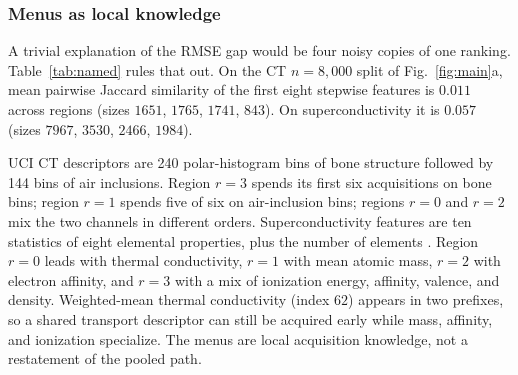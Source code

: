 \documentclass[pdflatex,sn-basic,Numbered]{sn-jnl}
\begin{document}
\subsubsection{Menus as local knowledge}
\label{sec:menu-knowledge}
A trivial explanation of the RMSE gap would be four noisy copies of one ranking. Table~\ref{tab:named} rules that out. On the CT \(n=8{,}000\) split of Fig.~\ref{fig:main}a, mean pairwise Jaccard similarity of the first eight stepwise features is \(0.011\) across regions (sizes \(1651\), \(1765\), \(1741\), \(843\)). On superconductivity it is \(0.057\) (sizes \(7967\), \(3530\), \(2466\), \(1984\)).

UCI CT descriptors are 240 polar-histogram bins of bone structure followed by 144 bins of air inclusions. Region \(r=3\) spends its first six acquisitions on bone bins; region \(r=1\) spends five of six on air-inclusion bins; regions \(r=0\) and \(r=2\) mix the two channels in different orders. Superconductivity features are ten statistics of eight elemental properties, plus the number of elements \cite{hamidieh2018}. Region \(r=0\) leads with thermal conductivity, \(r=1\) with mean atomic mass, \(r=2\) with electron affinity, and \(r=3\) with a mix of ionization energy, affinity, valence, and density. Weighted-mean thermal conductivity (index \(62\)) appears in two prefixes, so a shared transport descriptor can still be acquired early while mass, affinity, and ionization specialize. The menus are local acquisition knowledge, not a restatement of the pooled path.
\end{document}
